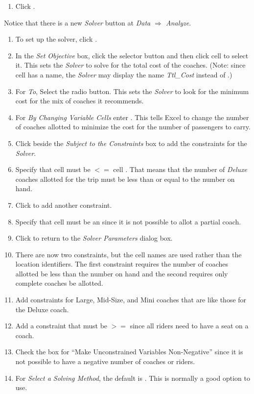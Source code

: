 \begin{enumerate}[resume]	
	\item Click .
\end{enumerate}

Notice that there is a new \textit{Solver} button at \textit{Data $ \Rightarrow $ Analyze}.

\begin{enumerate}[resume]
	\item To set up the solver, click .
	\item In the \textit{Set Objective} box, click the selector button and then click cell  to select it. This sets the \textit{Solver} to solve for the total cost of the coaches. (Note: since cell  has a name, the \textit{Solver}  may display the name \textit{Ttl\_Cost} instead of .)
	\item For \textit{To}, Select the  radio button. This sets the \textit{Solver} to look for the minimum cost for the mix of coaches it recommends.
	\item For \textit{By Changing Variable Cells} enter . This tells Excel to change the number of coaches allotted to minimize the cost for the number of passengers to carry.
	\item Click  beside the \textit{Subject to the Constraints} box to add the constraints for the \textit{Solver}.
	\item Specify that cell  must be $ <= $ cell . That means that the number of \textit{Deluxe} coaches allotted for the trip must be less than or equal to the number on hand.
	\item Click  to add another constraint.
	\item Specify that cell  must be an  since it is not possible to allot a partial coach.
	\item Click  to return to the \textit{Solver Parameters} dialog box. 
	\item There are now two constraints, but the cell names are used rather than the location identifiers. The first constraint requires the number of coaches allotted be less than the number on hand and the second requires only complete coaches be allotted.
	\item Add constraints for Large, Mid-Size, and Mini coaches that are like those for the Deluxe coach.
	\item Add a constraint that  must be $ >= $  since all riders need to have a seat on a coach.
	\item Check the box for ``Make Unconstrained Variables Non-Negative'' since it is not possible to have a negative number of coaches or riders.
	 \item For \textit{Select a Solving Method}, the default is . This is normally a good option to use.
	 
\end{enumerate}

